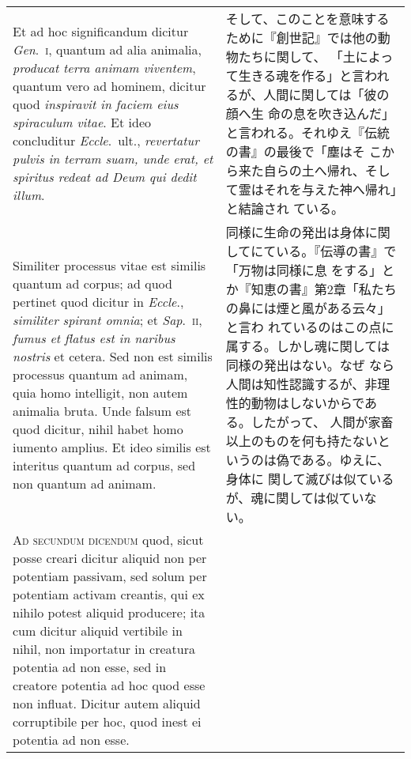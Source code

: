 \documentclass[paper=a4paper,fontsize=10pt,jafontsize=9pt,titlepage]{jlreq}
\begin{document}
\begin{longtable}{p{21em}p{21em}}
\\


Et ad hoc significandum
dicitur {\itshape Gen}.~{\scshape i}, quantum ad alia animalia, {\itshape producat terra animam
viventem}, quantum vero ad hominem, dicitur quod {\itshape inspiravit in faciem
eius spiraculum vitae}. Et ideo concluditur {\itshape Eccle}.~ult., {\itshape revertatur
pulvis in terram suam, unde erat, et spiritus redeat ad Deum qui dedit
illum}. 


&

そして、このことを意味するために『創世記』では他の動物たちに関して、
 「土によって生きる魂を作る」と言われるが、人間に関しては「彼の顔へ生
 命の息を吹き込んだ」と言われる。それゆえ『伝統の書』の最後で「塵はそ
 こから来た自らの土へ帰れ、そして霊はそれを与えた神へ帰れ」と結論され
 ている。



\\


Similiter processus vitae est similis quantum ad corpus; ad
quod pertinet quod dicitur in {\itshape Eccle}., {\itshape similiter spirant omnia}; et
{\itshape Sap}.~{\scshape ii}, {\itshape fumus et flatus est in naribus nostris} et cetera. Sed non est
similis processus quantum ad animam, quia homo intelligit, non autem
animalia bruta. Unde falsum est quod dicitur, nihil habet homo iumento
amplius. Et ideo similis est interitus quantum ad corpus, sed non
quantum ad animam.


&

同様に生命の発出は身体に関してにている。『伝導の書』で「万物は同様に息
 をする」とか『知恵の書』第2章「私たちの鼻には煙と風がある云々」と言わ
 れているのはこの点に属する。しかし魂に関しては同様の発出はない。なぜ
 なら人間は知性認識するが、非理性的動物はしないからである。したがって、
 人間が家畜以上のものを何も持たないというのは偽である。ゆえに、身体に
 関して滅びは似ているが、魂に関しては似ていない。


\\



{\scshape Ad secundum dicendum} quod, sicut posse creari dicitur aliquid non per
potentiam passivam, sed solum per potentiam activam creantis, qui ex
nihilo potest aliquid producere; ita cum dicitur aliquid vertibile in
nihil, non importatur in creatura potentia ad non esse, sed in
creatore potentia ad hoc quod esse non influat. Dicitur autem aliquid
corruptibile per hoc, quod inest ei potentia ad non esse.


&


\end{longtable}
\end{document}
